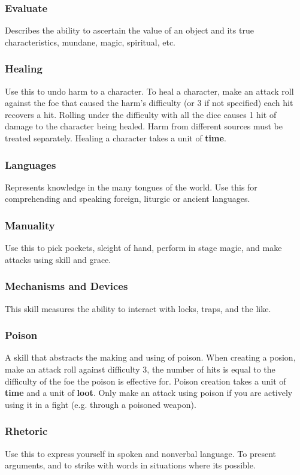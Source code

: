 \begin{multicols}{2}
\subsubsection*{Evaluate}
Describes the ability to ascertain the value of an object and its true characteristics, mundane, magic, spiritual, etc.
\subsubsection*{Healing}
Use this to undo harm to a character. To heal a character, make an attack roll against the foe that caused the harm's difficulty (or 3 if not specified) each hit recovers a hit. Rolling under the difficulty with all the dice causes 1 hit of damage to the character being healed. Harm from different sources must be treated separately. Healing a character takes a unit of \textbf{time}.
\subsubsection*{Languages}
Represents knowledge in the many tongues of the world. Use this for comprehending and speaking foreign, liturgic or ancient languages.
\subsubsection*{Manuality}
Use this to pick pockets, sleight of hand, perform in stage magic, and make attacks using skill and grace.
\subsubsection*{Mechanisms and Devices}
This skill measures the ability to interact with locks, traps, and the like.
\subsubsection*{Poison}
A skill that abstracts the making and using of poison. When creating a posion, make an attack roll against difficulty 3, the number of hits is equal to the difficulty of the foe the poison is effective for. Poison creation takes a unit of \textbf{time} and a unit of \textbf{loot}. Only make an attack using poison if you are actively using it in a fight (e.g. through a poisoned weapon).
\subsubsection*{Rhetoric}
Use this to express yourself in spoken and nonverbal language. To present arguments, and to strike with words in situations where its possible.

\end{multicols}

